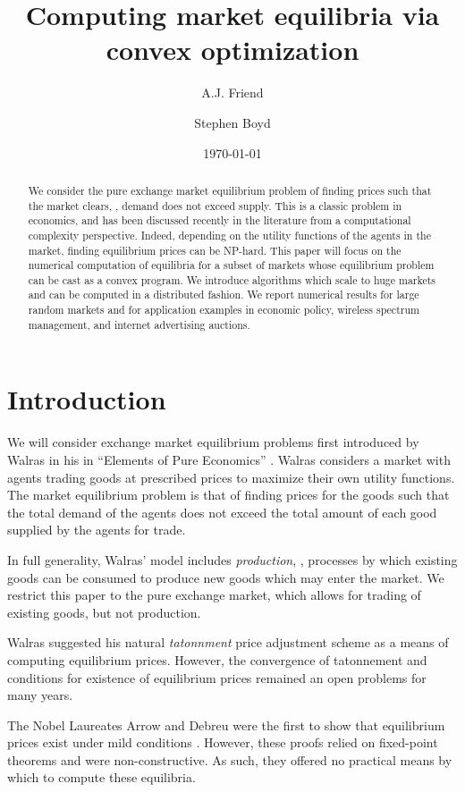 \documentclass[12pt]{article}
\title{Computing market equilibria via convex optimization}
\author{A.J. Friend \and Stephen Boyd}
\date{\today}
\begin{document}
\maketitle

\begin{abstract}
We consider the pure exchange market equilibrium problem of finding prices
such that the market clears, \ie, demand does not exceed supply.
This is a classic problem in economics, and has been discussed recently
in the literature from a computational complexity perspective.
Indeed, depending on the utility functions of the agents in the market,
finding equilibrium prices can be NP-hard.
This paper will focus on the numerical computation
of equilibria for a subset of markets whose equilibrium
problem can be cast as a convex program.
We introduce algorithms which scale to huge markets and can be computed
in a distributed fashion.
We report numerical results for large random markets and for
application examples in economic policy, wireless spectrum management,
and internet advertising auctions.
\end{abstract}

\newpage
\tableofcontents
\newpage
\listoftodos
\newpage

\section{Introduction}
We will consider exchange market equilibrium problems first introduced by
Walras in his in ``Elements of Pure Economics''
\cite{walras1896elements}.
Walras considers a market with agents trading
goods at prescribed prices to maximize their own utility functions.
The market equilibrium problem is that of finding prices for the goods
such that the total demand of the agents does not exceed the total amount
of each good supplied by the agents for trade.

In full generality, Walras' model includes \emph{production}, \ie, processes by which existing goods can be consumed to produce new goods which may enter the market.
We restrict this paper to the pure exchange market, which allows for trading of existing goods, but not production.

Walras suggested his natural \emph{tatonnment} price adjustment scheme as a means of computing equilibrium prices.
However, the convergence of tatonnement and conditions for existence of equilibrium prices remained an open problems for many years.

The Nobel Laureates Arrow and Debreu were the first to show that equilibrium
prices exist under mild conditions \cite{arrow1954existence}.
However, these proofs relied on fixed-point theorems and were non-constructive.
As such, they offered no practical means by which to compute these equilibria.
\end{document}
